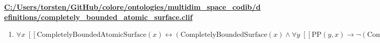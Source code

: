 \documentclass{article}
\begin{document}
\textbf{\url{C:/Users/torsten/GitHub/colore/ontologies/multidim\_space\_codib/definitions/completely\_bounded\_atomic\_surface.clif}}

\begin{enumerate}
\item $\forall x\;  \left[ \left[ \textrm{CompletelyBoundedAtomicSurface}(x) \leftrightarrow \left(\textrm{CompletelyBoundedSurface}(x) \land \forall y\;  \left[ \left[ \textrm{PP}(y,x) \rightarrow \neg \left(\textrm{CompletelyBoundedSurface}(y)\right) \right] \right]\right) \right] \right]$
\end{enumerate}
\end{document}
